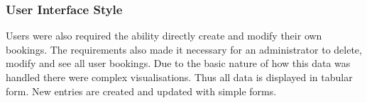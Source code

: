 \subsubsection{User Interface Style}
\par 
Users were also required the ability directly create and modify their own bookings. The requirements also made it necessary for an administrator to delete, modify and see all user bookings. Due to the basic nature of how this data was handled there were complex visualisations. Thus all data is displayed in tabular form. New entries are created and updated with simple forms.
